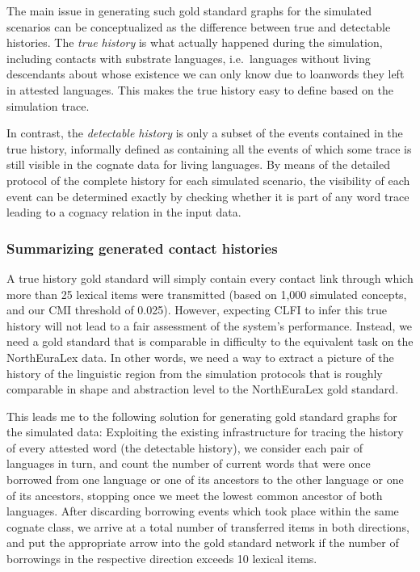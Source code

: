 The main issue in generating such gold standard graphs for the simulated scenarios can be conceptualized as the difference between true and detectable histories. The \textit{true history} is what actually happened during the simulation, including contacts with substrate languages, i.e.\ languages without living descendants about whose existence we can only know due to loanwords they left in attested languages. This makes the true history easy to define based on the simulation trace.

In contrast, the \textit{detectable history} is only a subset of the events contained in the true history, informally defined as containing all the events of which some trace is still visible in the cognate data for living languages. By means of the detailed protocol of the complete history for each simulated scenario, the visibility of each event can be determined exactly by checking whether it is part of any word trace leading to a cognacy relation in the input data.

\subsubsection{Summarizing generated contact histories}
A true history gold standard will simply contain every contact link through which more than 25 lexical items were transmitted (based on 1,000 simulated concepts, and our CMI threshold of 0.025). However, expecting CLFI to infer this true history will not lead to a fair assessment of the system's performance. Instead, we need a gold standard that is comparable in difficulty to the equivalent task on the NorthEuraLex data. In other words, we need a way to extract a picture of the history of the linguistic region from the simulation protocols that is roughly comparable in shape and abstraction level to the NorthEuraLex gold standard.

This leads me to the following solution for generating gold standard graphs for the simulated data: Exploiting the existing infrastructure for tracing the history of every attested word (the detectable history), we consider each pair of languages in turn, and count the number of current words that were once borrowed from one language or one of its ancestors to the other language or one of its ancestors, stopping once we meet the lowest common ancestor of both languages. After discarding borrowing events which took place within the same cognate class, we arrive at a total number of transferred items in both directions, and put the appropriate arrow into the gold standard network if the number of borrowings in the respective direction exceeds 10 lexical items.

